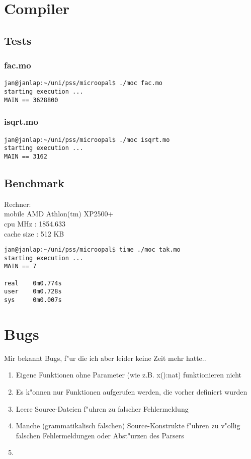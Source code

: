 \documentclass[a4paper,12pt]{report}
\begin{document}
\chapter{Compiler}
\section{Tests}
\subsection{fac.mo} 
\begin{verbatim}
jan@janlap:~/uni/pss/microopal$ ./moc fac.mo
starting execution ...
MAIN == 3628800
\end{verbatim}

\subsection{isqrt.mo} 
\begin{verbatim}
jan@janlap:~/uni/pss/microopal$ ./moc isqrt.mo
starting execution ...
MAIN == 3162
\end{verbatim}

\section{Benchmark}
Rechner:\\
mobile AMD Athlon(tm) XP2500+\\
cpu MHz         : 1854.633\\
cache size      : 512 KB
\begin{verbatim}
jan@janlap:~/uni/pss/microopal$ time ./moc tak.mo
starting execution ...
MAIN == 7

real    0m0.774s
user    0m0.728s
sys     0m0.007s
\end{verbatim}



\chapter{Bugs}
Mir bekannt Bugs, f"ur die ich aber leider keine Zeit mehr hatte..
\begin{enumerate}
\item Eigene Funktionen ohne Parameter (wie z.B. x():nat) funktionieren nicht
\item Es k"onnen nur Funktionen aufgerufen werden, die vorher definiert wurden
\item Leere Source-Dateien f"uhren zu falscher Fehlermeldung
\item Manche (grammatikalisch falschen) Source-Konstrukte f"uhren zu v"ollig falschen Fehlermeldungen oder Abst"urzen des Parsers
\item 
\end{enumerate}


\end{document}
